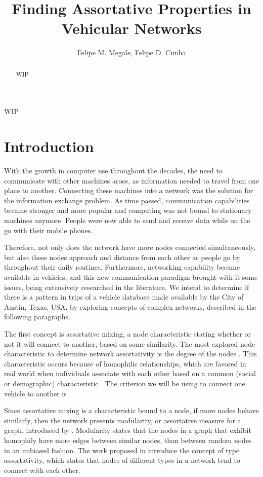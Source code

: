 \documentclass[12pt]{article}
\title{Finding Assortative Properties in Vehicular Networks}
\author{Felipe M. Megale\inst{1}, Felipe D. Cunha\inst{1} }
\begin{document}
 

\maketitle

\begin{abstract}
    WIP
\end{abstract}

\begin{resumo}
    WIP
\end{resumo}

\section{Introduction}

With the growth in computer use throughout the decades, the need to communicate with other machines arose, as information needed to travel from one place to another. Connecting these machines into a network was the solution for the information exchange problem. As time passed, communication capabilities became stronger and more popular and computing was not bound to stationary machines anymore. People were now able to send and receive data while on the go with their mobile phones.

Therefore, not only does the network have more nodes connected simultaneously, but also these nodes approach and distance from each other as people go by throughout their daily routines. Furthermore, networking capability became available in vehicles, and this new communication paradigm brought with it some issues, being extensively researched in the literature. We intend to determine if there is a pattern in trips of a vehicle database made available by the City of Austin, Texas, USA, by exploring concepts of complex networks, described in the following paragraphs.

The first concept is assortative mixing, a node characteristic stating whether or not it will connect to another, based on some similarity. The most explored node characteristic to determine network assortativity is the degree of the nodes \cite{Newman-assort-2003}. This characteristic occurs because of homophilic relationships, which are favored in real world when individuals associate with each other based on a common (social or demographic) characteristic \cite{lazarfeld:54}. The criterion we will be using to connect one vehicle to another is 

Since assortative mixing is a characteristic bound to a node, if more nodes behave similarly, then the network presents modularity, or assortative measure for a graph, introduced by \cite{PhysRevE.70.066111}. Modularity states that the nodes in a graph that exhibit homophily have more edges between similar nodes, than between random nodes in an unbiased fashion. The work proposed in \cite{vaanunu:2018} introduce the concept of type assortativity, which states that nodes of different types in a network tend to connect with each other.
\end{document}
